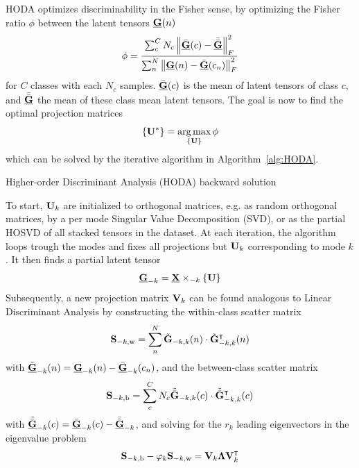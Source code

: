 \documentclass[twocolumn]{article}
\begin{document}
\textsc{HODA} optimizes discriminability in the Fisher sense, by optimizing the
Fisher ratio $\phi$ between the latent tensors $\ten{G}(n)$
\begin{equation}
	\phi = \frac{\sum_c^CN_c\left\lVert\bar{\ten{G}}(c)-\bar{\bar{\ten{G}}}\right\rVert_F^2}
	{\sum_n^N\left\lVert\ten{G}(n)-\bar{\ten{G}}(c_n)\right\rVert_F^2}
	\label{eq:fisher}
\end{equation}
for $C$ classes with each $N_c$ samples. $\bar{\ten{G}}(c)$ is the mean of
latent
tensors of class $c$, and $\bar{\bar{\ten{G}}}$ the mean of
these class mean latent tensors.
The goal is now to find the optimal projection matrices
\begin{equation}
	\left\{\mat{U}^*\right\} = \argmax_{\{\mat{U}\}}\phi
\end{equation}
which can be solved by the iterative algorithm in Algorithm~\ref{alg:HODA}.
\begin{algorithm}
	\caption{Higher-order Discriminant Analysis (\textsc{HODA}) backward solution}
	\label{alg:HODA}
	
\end{algorithm}
To start, $\mat{U}_k$ are initialized to orthogonal matrices, e.g. as random
orthogonal matrices, by a per mode Singular Value Decomposition (\textsc{SVD}),
or as the partial \textsc{HOSVD} of all stacked tensors in the dataset.
At each iteration, the algorithm loops trough the modes and fixes all
projections but $\mat{U}_k$ corresponding to mode $k$.
It then finds a partial latent tensor
\begin{equation}
	\ten{G}_{-k}=\ten{X}\mmprs{\mat{U}}{k}
\end{equation}
Subsequently, a new projection matrix $\mat{V}_k$ can be found analogous to Linear
Discriminant Analysis by constructing the within-class scatter matrix
\begin{equation}
	\mat{S}_{-k,\text{w}} = \sum_n^N\tilde{\mat{G}}_{-k,k}(n)\cdot\tilde{\mat{G}}_{-k,k}^\intercal(n)
\end{equation}
with $\tilde{\ten{G}}_{-k}(n) = \ten{G}_{-k}(n) - \bar{\ten{G}}_{-k}(c_n)$,
and the between-class scatter matrix
\begin{equation}
	\mat{S}_{-k,\text{b}} =
	\sum_c^CN_c\tilde{\bar{\mat{G}}}_{-k,k}(c)\cdot\tilde{\bar{\mat{G}}}_{-k,k}^\intercal(c)
\end{equation}
with $\tilde{\bar{\ten{G}}}_{-k}(c) = \bar{\ten{G}}_{-k}(c) - \bar{\bar{\ten{G}}}_{-k}$,
and solving for the $r_k$ leading eigenvectors in the eigenvalue problem
\begin{equation}
	\mat{S}_{-k,\text{b}}-\varphi_k\mat{S}_{-k,\text{w}} =
	\mat{V}_k\mat{\Lambda}\mat{V}_k^\intercal
\end{equation}
\end{document}
